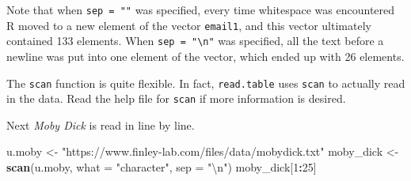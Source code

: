 \documentclass[
]{krantz}
\newenvironment{Shaded}{\begin{snugshade}}{\end{snugshade}}
\newcommand{\CharTok}[1]{\textcolor[rgb]{0.31,0.60,0.02}{#1}}
\newcommand{\DataTypeTok}[1]{\textcolor[rgb]{0.13,0.29,0.53}{#1}}
\newcommand{\DecValTok}[1]{\textcolor[rgb]{0.00,0.00,0.81}{#1}}
\newcommand{\KeywordTok}[1]{\textcolor[rgb]{0.13,0.29,0.53}{\textbf{#1}}}
\newcommand{\NormalTok}[1]{#1}
\newcommand{\OperatorTok}[1]{\textcolor[rgb]{0.81,0.36,0.00}{\textbf{#1}}}
\newcommand{\StringTok}[1]{\textcolor[rgb]{0.31,0.60,0.02}{#1}}
\begin{document}
Note that when \texttt{sep\ =\ ""} was specified, every time whitespace was encountered R moved to a new element of the vector \texttt{email1}, and this vector ultimately contained 133 elements. When \texttt{sep\ =\ "\textbackslash{}n"} was specified, all the text before a newline was put into one element of the vector, which ended up with 26 elements.

The \texttt{scan} function is quite flexible. In fact, \texttt{read.table} uses \texttt{scan} to actually read in the data. Read the help file for \texttt{scan} if more information is desired.

Next \emph{Moby Dick} is read in line by line.

\begin{Shaded}
\begin{Highlighting}[]
\NormalTok{u.moby \textless{}{-}}\StringTok{ "https://www.finley{-}lab.com/files/data/mobydick.txt"}
\NormalTok{moby\_dick \textless{}{-}}\StringTok{ }\KeywordTok{scan}\NormalTok{(u.moby, }\DataTypeTok{what =} \StringTok{"character"}\NormalTok{, }\DataTypeTok{sep =} \StringTok{"}\CharTok{\textbackslash{}n}\StringTok{"}\NormalTok{)}
\NormalTok{moby\_dick[}\DecValTok{1}\OperatorTok{:}\DecValTok{25}\NormalTok{]}
\end{Highlighting}
\end{Shaded}
\end{document}
